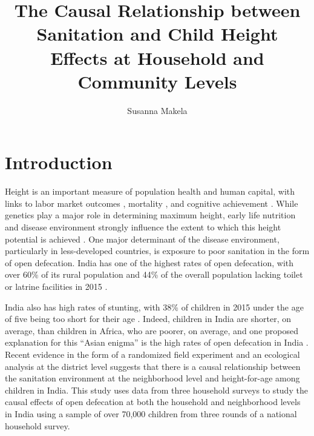 \documentclass[12pt,a4paper,titlepage]{article}
\author{Susanna Makela}
\title{The Causal Relationship between Sanitation and Child Height \\
		\Large Effects at Household and Community Levels}
\begin{document}
\maketitle
\singlespacing

\section{Introduction}
Height is an important measure of population health and human capital, with links to labor market outcomes \citep{case_paxson, vogl}, mortality \citep{jousilahti}, and cognitive achievement \citep{spears2012}. While genetics play a major role in determining maximum height, early life nutrition and disease environment strongly influence the extent to which this height potential is achieved \citep{humphrey}. One major determinant of the disease environment, particularly in less-developed countries, is exposure to poor sanitation in the form of open defecation. India has one of the highest rates of open defecation, with over 60\% of its rural population and 44\% of the overall population lacking toilet or latrine facilities in 2015 \citep{jmp_2015}.

India also has high rates of stunting, with 38\% of children in 2015 under the age of five being too short for their age \citep{nfhs4_factsheet}. Indeed, children in India are shorter, on average, than children in Africa, who are poorer, on average, and one proposed explanation for this ``Asian enigma'' is the high rates of open defecation in India \citep{spears_intl_variation}. Recent evidence in the form of a randomized field experiment \citep{village_san} and an ecological analysis at the district level \citep{ecological} suggests that there is a causal relationship between the sanitation environment at the neighborhood level and height-for-age among children in India. This study uses data from three household surveys to study the causal effects of open defecation at both the household and neighborhood levels in India using a sample of over 70,000 children from three rounds of a national household survey.
\end{document}
